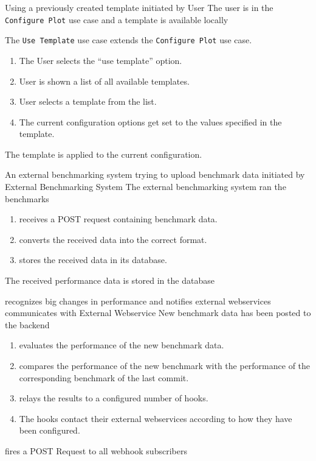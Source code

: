 {Using a previously created template}
{initiated by User}
{The user is in the \texttt{Configure Plot} use case and a \gls{template} is available locally}
{The \texttt{Use Template} use case extends the \texttt{Configure Plot} use case.
\begin{enumerate}
    \item The User selects the \enquote{use template} option.
    \item User is shown a list of all available \glspl{template}.
    \item User selects a \gls{template} from the list.
    \item The current \gls{configuration} options get set to the values specified in the template.
\end{enumerate}}
{The \gls{template} is applied to the current configuration.}

\bigskip

{An external \gls{benchmarking system} trying to upload benchmark data}
{initiated by External Benchmarking System}
{The external \gls{benchmarking system} ran the benchmarks}
{\begin{enumerate}
    \item \parkview{} receives a POST request containing benchmark data.
    \item \parkview{} converts the received data into the correct format.
    \item \parkview{} stores the received data in its database.
\end{enumerate}}
{The received performance data is stored in the database}

\bigskip

{\parkview{} recognizes big changes in performance and notifies external webservices}
{communicates with External Webservice}
{New benchmark data has been posted to the backend}
{\begin{enumerate}
    \item \parkview{} evaluates the performance of the new benchmark data.
    \item \parkview{} compares the performance of the new benchmark with the performance of the corresponding benchmark of the last commit.
    \item \parkview{} relays the results to a configured number of hooks.
    \item The hooks contact their external webservices according to how they have been configured.
\end{enumerate}}
{\parkview{} fires a POST Request to all webhook subscribers}

